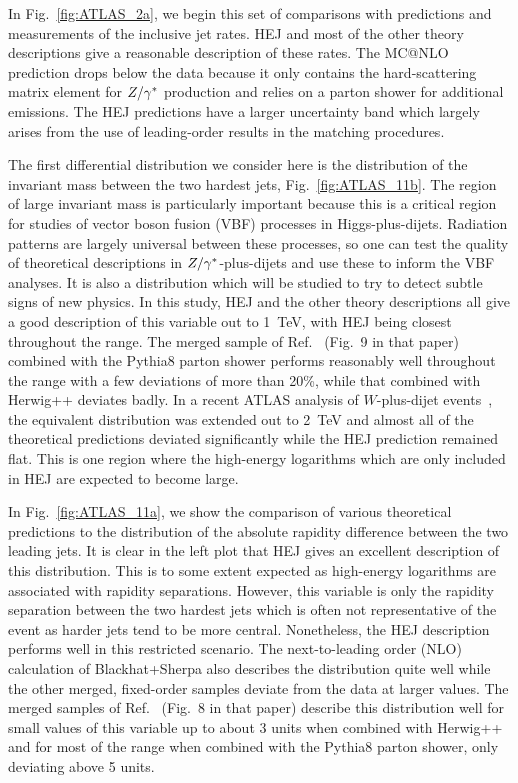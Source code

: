 	In Fig.~\ref{fig:ATLAS_2a}, we begin this set of comparisons with predictions
	and measurements of the inclusive jet rates.  HEJ and most of the other theory
	descriptions give a reasonable description of these rates.  The MC@NLO
	prediction drops below the data because it only contains the hard-scattering
	matrix element for $Z/\gamma^*$ production and relies on a parton shower for additional
	emissions. The HEJ predictions have a larger uncertainty band which largely
	arises from the use of leading-order results in the matching procedures.

	The first differential distribution we consider here is the distribution of the
	invariant mass between the two hardest jets, Fig.~\ref{fig:ATLAS_11b}.  The
	region of large invariant mass is particularly important because this is a
	critical region for studies of vector boson fusion (VBF) processes in
	Higgs-plus-dijets.  Radiation patterns are largely universal between these
	processes, so one can test the quality of theoretical descriptions in
	$Z/\gamma^*$-plus-dijets and use these to inform the VBF analyses.  It is also a
	distribution which will be studied to try to detect subtle signs of new physics.
	In this study, HEJ and the other theory descriptions all give a good description
	of this variable out to 1~TeV, with HEJ being closest throughout the range.  The
	merged sample of Ref.~\cite{Frederix:2015eii} (Fig.~9 in that paper) combined
	with the Pythia8 parton shower performs reasonably well throughout the range
	with a few deviations of more than 20\%, while that combined with Herwig++
	deviates badly.  In a recent ATLAS analysis of $W$-plus-dijet
	events~\cite{Aad:2014qxa}, the equivalent distribution was extended out to 2~TeV
	and almost all of the theoretical predictions deviated significantly while the
	HEJ prediction remained flat.  This is one region where the high-energy
	logarithms which are only included in HEJ are expected to become large.

	In Fig.~\ref{fig:ATLAS_11a}, we show the comparison of various theoretical
	predictions to the distribution of the absolute rapidity difference between the
	two leading jets.  It is clear in the left plot that HEJ gives an excellent
	description of this distribution.  This is to some extent expected as
	high-energy logarithms are associated with rapidity separations.  However, this
	variable is only the rapidity separation between the two hardest jets which is
	often not representative of the event as harder jets tend to be more central.
	Nonetheless, the HEJ description performs well in this restricted scenario.  The
	next-to-leading order (NLO) calculation of Blackhat+Sherpa also describes the
	distribution quite well while the other merged, fixed-order samples deviate from
	the data at larger values.  The merged samples of Ref.~\cite{Frederix:2015eii}
	(Fig.~8 in that paper) describe this distribution well for small values of this
	variable up to about 3 units when combined with Herwig++ and for most of the
	range when combined with the Pythia8 parton shower, only deviating above 5 units.

